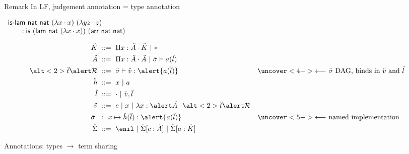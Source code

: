 \documentclass[ignorenonframetext,red]{beamer}
\begin{document}
\begin{frame}{}
  \begin{block}{Remark}
    In LF, judgement annotation = type annotation

    \begin{example}
      $
      \begin{array}{l}
        \text{\textsf{is-lam}}\ \mathsf{nat}\ \mathsf{nat}\ (\lambda{x}\cdot
        x)\ (\lambda{y z}\cdot z) \\ \qquad : \mathsf{is}\ (\mathsf{lam}\
        \mathsf{nat}\ (\lambda{x}\cdot x))\ (\mathsf{arr}\ \mathsf{nat}\
        \mathsf{nat})
      \end{array}
      $
    \end{example}
  \end{block}
  \pause
  \inXLF\inXLFa
  \begin{align*}
    \mk &\gequal \prd\mv\mf\mk \gor \type \\
    \mf &\gequal \prd\mv\mf\mf \gor \sapply\ms{\lapp\mcf\ma} \\
    \alt<2>\mo{\alert\mr} &\gequal
    \sapply\ms{\typ\mval{\alert{\lapp\mcf\ma}}} &&
      \uncover<4->{\text{$\longleftarrow$ $\ms$ DAG, binds in $\mval$ and
          $\ma$}} \\
    \mh &\gequal \mv \gor \mcf \\
    \ma &\gequal \lnil \gor \lcons\mval\ma \\
    \mval &\gequal \mco \gor \mv \gor \lam\mv{\alert\mf}{\alt<2>\mo{\alert\mr}} \\
    \ms\ &\ :\ \mv\mapsto{\laapp\mh\ma{\alert{\lapp\mcf\ma}}} &&
      \uncover<5->{\text{$\longleftarrow$ named implementation}} \\
    \msi &\gequal { \enil \gor \ebinddecl\msi\mco\mf \gor
      \ebinddecl\msi\mcf\mk }
  \end{align*}
\end{frame}

\begin{frame}{Annotations: types $\to$ term sharing}
\end{frame}
\end{document}
